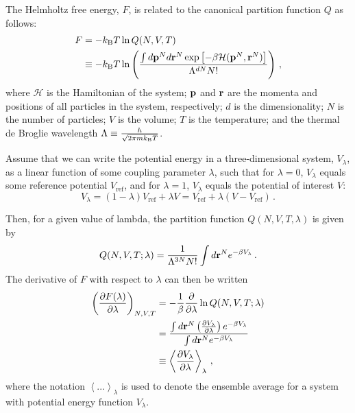 The Helmholtz free energy, $F$, is related to the canonical partition function $Q$ as follows:
\begin{align}	
	F &= - k_{\textrm B} T \ln Q(N, V, T) \notag \\
	&\equiv -k_{\textrm B} T \ln \left(\frac{\int d {\bf{p}}^N d {\bf{r}}^N \exp\left[-\beta \mathcal{H}({\bf {p}}^N, {\bf {r}}^N)\right]}{\Lambda^{dN} N!}\right) \,,
\end{align}
where $\mathcal{H}$ is the Hamiltonian of the system; $\bf p$ and $\bf r$ are the momenta and positions of all particles in the system, respectively; $d$ is the dimensionality; $N$ is the number of particles; $V$ is the volume; $T$ is the temperature; and the thermal de Broglie wavelength $\Lambda \equiv \frac{h}{\sqrt{2 \pi m k_{\textrm B} T}}$.

Assume that we can write the potential energy in a three-dimensional system, $V_\lambda$, as a linear function of some coupling parameter $\lambda$, such that for $\lambda = 0$, $V_\lambda$ equals some reference potential $V_{\textrm {ref}}$, and for $\lambda = 1$, $V_\lambda$ equals the potential of interest $V$:
\begin{equation}
	V_\lambda = (1 - \lambda)V_{\textrm {ref}} + \lambda V = V_{\textrm {ref}} + \lambda(V - V_{\textrm {ref}}) \,.
\end{equation}

Then, for a given value of lambda, the partition function $Q(N, V, T, \lambda)$ is given by
\begin{equation}	
	Q(N, V, T; \lambda) = \frac{1}{\Lambda^{3 N} N!}\int{d {\bf {r}}^N e^{-\beta V_\lambda}} \,.
\end{equation}
The derivative of $F$ with respect to $\lambda$ can then be written
\begin{align}
	\left(\frac{\partial F(\lambda)}{\partial \lambda}\right)_{N, V, T} &= -\frac{1}{\beta} \frac{\partial}{\partial \lambda} \ln Q(N, V, T; \lambda) \notag\\
	&= \frac{\int{d {\bf {r}}^N \left(\frac{\partial V_{\lambda}}{\partial \lambda}\right)e^{-\beta V_\lambda}}}{\int{d {\bf {r}}^N e^{-\beta V_\lambda}}} \notag\\
	&\equiv \left<\frac{\partial V_\lambda}{\partial \lambda}\right>_\lambda \,,
\end{align}
where the notation $\left<...\right>_\lambda$ is used to denote the ensemble average for a system with potential energy function $V_\lambda$.


